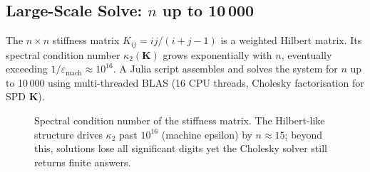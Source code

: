 \documentclass[11pt, a4paper]{article}
\begin{document}
\subsection{Large-Scale Solve: \texorpdfstring{$n$}{n} up to 10\,000}\label{sec:largescale}

The $n\times n$ stiffness matrix $K_{ij}=ij/(i+j-1)$ is a weighted Hilbert matrix.  Its spectral condition number $\kappa_2(\mathbf{K})$ grows exponentially with $n$, eventually exceeding $1/\varepsilon_{\text{mach}}\approx 10^{16}$.  A Julia script assembles and solves the system for $n$ up to 10\,000 using multi-threaded BLAS (16 CPU threads, Cholesky factorisation for SPD $\mathbf{K}$).

\begin{figure}[H]
\centering
{}
\caption{Spectral condition number of the stiffness matrix.  The Hilbert-like structure drives $\kappa_2$ past $10^{16}$ (machine epsilon) by $n\approx 15$; beyond this, solutions lose all significant digits yet the Cholesky solver still returns finite answers.}
\label{fig:cond}
\end{figure}
\end{document}
